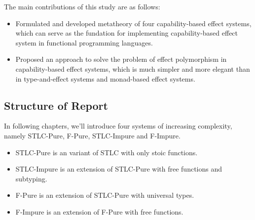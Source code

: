 The main contributions of this study are as follows:

\begin{itemize}
\item Formulated and developed metatheory of four capability-based
  effect systems, which can serve as the fundation for implementing
  capability-based effect system in functional programming languages.
\item Proposed an approach to solve the problem of effect polymorphism
  in capability-based effect systems, which is much simpler and more
  elegant than in type-and-effect systems and monad-based effect
  systems.
\end{itemize}

\subsection{Structure of Report}

In following chapters, we'll introduce four systems of increasing
complexity, namely STLC-Pure, F-Pure, STLC-Impure and F-Impure.

\begin{itemize}
\item STLC-Pure is an variant of STLC with only stoic functions.
\item STLC-Impure is an extension of STLC-Pure with free functions and subtyping.
\item F-Pure is an extension of STLC-Pure with universal types.
\item F-Impure is an extension of F-Pure with free functions.
\end{itemize}
